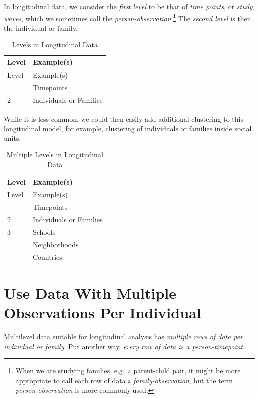 \documentclass[
  letterpaper,
  DIV=11,
  numbers=noendperiod]{scrreprt}
\begin{document}
In longitudinal data, we consider the \emph{first level} to be that of
\emph{time points}, or \emph{study waves}, which we sometimes call the
\emph{person-observation}.\footnote{When we are studying families,
  e.g.~a parent-child pair, it might be more appropriate to call each
  row of data a \emph{family-observation}, but the term
  \emph{person-observation} is more commonly used.}
 The \emph{second level} is then the
individual or family.

\begin{longtable}[]{@{}ll@{}}
\caption{Levels in Longitudinal
Data}\label{tbl-levelslongitudinal}\tabularnewline
\toprule\noalign{}
Level & Example(s) \\
\midrule\noalign{}
\endfirsthead
\toprule\noalign{}
Level & Example(s) \\
\midrule\noalign{}
\endhead
\bottomrule\noalign{}
\endlastfoot
1 & Timepoints \\
2 & Individuals or Families \\
\end{longtable}

While it is less common, we could then easily add additional clustering
to this longitudinal model, for example, clustering of individuals or
families inside social units.

\begin{longtable}[]{@{}ll@{}}
\caption{Multiple Levels in Longitudinal
Data}\label{tbl-levelslongitudinal2}\tabularnewline
\toprule\noalign{}
Level & Example(s) \\
\midrule\noalign{}
\endfirsthead
\toprule\noalign{}
Level & Example(s) \\
\midrule\noalign{}
\endhead
\bottomrule\noalign{}
\endlastfoot
1 & Timepoints \\
2 & Individuals or Families \\
3 & Schools \\
& Neighborhoods \\
& Countries \\
\end{longtable}

\section{Use Data With Multiple Observations Per
Individual}\label{use-data-with-multiple-observations-per-individual}

Multilevel data suitable for longitudinal analysis has \emph{multiple
rows of data per individual or family}. Put another way, \emph{every row
of data is a person-timepoint}.
\end{document}
